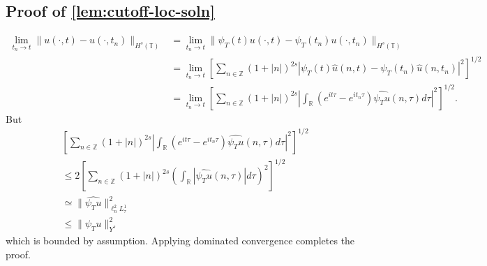 \documentclass[12pt,reqno]{amsart}
\numberwithin{equation}{section}  %
\numberwithin{figure}{section}
\newcommand{\rr}{\mathbb{R}}
\newcommand{\zz}{\mathbb{Z}}
\newcommand{\ci}{\mathbb{T}}
\newcommand{\wh}{\widehat}
\theoremstyle{plain}
\theoremstyle{definition}
\theoremstyle{remark}
\begin{document}
\subsection{Proof of \autoref{lem:cutoff-loc-soln}}
%
%
\begin{equation*}
	\begin{split}
		\lim_{t_{n} \to t} \|u(\cdot, t) - u(\cdot, t_{n})\|_{H^s(\ci)} 
    & = \lim_{t_{n} \to t} \|\psi_{T}(t) u(\cdot, t) - \psi_{T}(t_n) u(\cdot, t_{n})\|_{H^s(\ci)} 
		\\
		& = \lim_{t_n \to t} \left[ \sum_{n \in \zz}\left( 1 + | n |
    \right)^{2s} | \psi_{T}(t)  \wh{u}(n, t) - \psi_{T}(t_n) \wh{ u}(n, t_n) |^2 \right]^{1/2}
		\\
		& = \lim_{t_n \to t} \left[ \sum_{n \in \zz} \left( 1 + | n |
    \right)^{2s} | \int_{\rr} (e^{it \tau} - e^{it_{n} \tau})
    \wh{\psi_{T} u}(n,
		\tau) d \tau |^2 \right]^{1/2}.
	\end{split}
\end{equation*}
		But
		\begin{equation*}
			\begin{split}
        & \left[ \sum_{n \in \zz} \left( 1 + | n |
                \right)^{2s} | \int_{\rr} (e^{it \tau} - e^{it_{n}\tau})
                \wh{\psi_{T} u}(n, \tau) d \tau |^2 \right]^{1/2}
        \\
        & \le 2 \left [ \sum_{n \in \zz}  \left( 1 + | n |
        \right)^{2s} \left ( \int_{\rr} |\wh{\psi_{T} u}(n, \tau)| d \tau
        \right )^2  \right ]^{1/2}
        \\
        & \simeq \|\wh{\psi_{T} u}\|_{\ell^{2}_{n}L^{1}_{\tau}}^2
		\\
		& \le \|\psi_{T} u \|_{Y^s}^2 
	\end{split}
\end{equation*}
which is bounded by assumption.
Applying dominated convergence completes the proof. \qquad \qedsymbol
%
%
%
%
%
\end{document}
